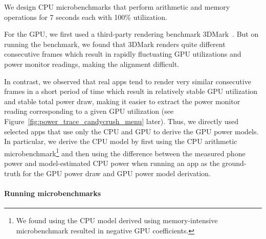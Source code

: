 
We design CPU microbenchmarks that perform 
arithmetic and memory operations for 7 seconds each 
with 100\% utilization.

\begin{sloppy}
For the GPU, we first used a third-party rendering benchmark 3DMark~\cite{3DMark}. 
	But on running the benchmark, we found that 3DMark renders quite different
	consecutive frames which result in rapidly fluctuating GPU utilizations and
	power monitor readings, making the alignment  difficult. 
\end{sloppy}
In contrast, we observed that real apps tend to render very similar consecutive
frames in a short period of time which result in relatively stable GPU
utilization and stable total power draw, making it easier to extract the power
monitor reading corresponding to a given GPU utilization (see
Figure~\ref{fig:power_trace_candycrush_menu} later).  Thus, we directly used
selected apps that use only the CPU and GPU to derive the GPU power models.  In
particular, we derive the CPU model by first using the 
CPU arithmetic microbenchmark\footnote{We found using the CPU model derived
using memory-intensive microbenchmark resulted in negative GPU coefficients.}
and then using the difference between the measured phone power and
model-estimated CPU power when running an app as the ground-truth for the GPU
power draw and GPU power model derivation.


\paragraph{Running microbenchmarks}
 

